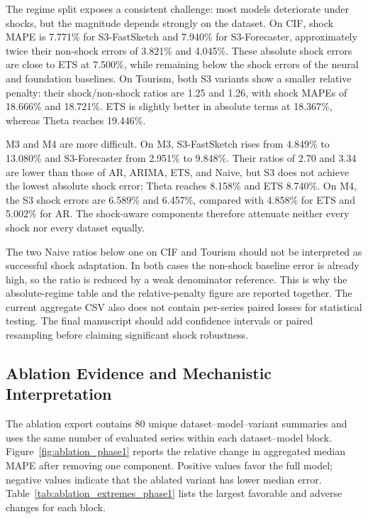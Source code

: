 

The regime split exposes a consistent challenge: most models deteriorate under
shocks, but the magnitude depends strongly on the dataset. On CIF, shock MAPE
is 7.771\% for S3-FastSketch and 7.940\% for S3-Forecaster, approximately twice
their non-shock errors of 3.821\% and 4.045\%. These absolute shock errors are
close to ETS at 7.500\%, while remaining below the shock errors of the neural
and foundation baselines. On Tourism, both S3 variants show a smaller relative
penalty: their shock/non-shock ratios are 1.25 and 1.26, with shock MAPEs of
18.666\% and 18.721\%. ETS is slightly better in absolute terms at 18.367\%,
whereas Theta reaches 19.446\%.

M3 and M4 are more difficult. On M3, S3-FastSketch rises from 4.849\% to
13.080\% and S3-Forecaster from 2.951\% to 9.848\%. Their ratios of 2.70 and
3.34 are lower than those of AR, ARIMA, ETS, and Naive, but S3 does not achieve
the lowest absolute shock error; Theta reaches 8.158\% and ETS 8.740\%. On M4,
the S3 shock errors are 6.589\% and 6.457\%, compared with 4.858\% for ETS and
5.002\% for AR. The shock-aware components therefore attenuate neither every
shock nor every dataset equally.

The two Naive ratios below one on CIF and Tourism should not be interpreted as
successful shock adaptation. In both cases the non-shock baseline error is
already high, so the ratio is reduced by a weak denominator reference. This is
why the absolute-regime table and the relative-penalty figure are reported
together. The current aggregate CSV also does not contain per-series paired
losses for statistical testing. The final manuscript should add confidence
intervals or paired resampling before claiming significant shock robustness.

\subsection{Ablation Evidence and Mechanistic Interpretation}
\label{subsec:ablation_results}

The ablation export contains 80 unique dataset--model--variant summaries and
uses the same number of evaluated series within each dataset--model block.
Figure~\ref{fig:ablation_phase1} reports the relative change in aggregated
median MAPE after removing one component. Positive values favor the full model;
negative values indicate that the ablated variant has lower median error.
Table~\ref{tab:ablation_extremes_phase1} lists the largest favorable and adverse
changes for each block.

